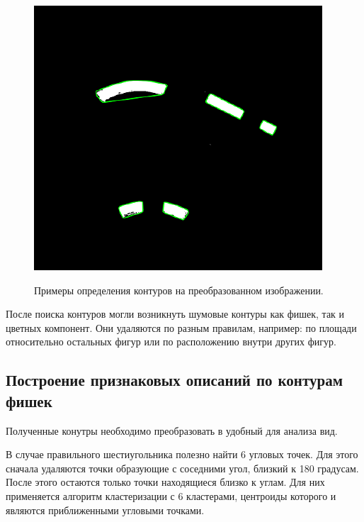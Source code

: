 \documentclass[10pt]{article}
\begin{document}
\begin{figure}[h]
\begin{minipage}[h]{0.19\linewidth}
\begin{center}
	    	\end{center}
	    \end{minipage}
        \hfill
        \begin{minipage}[h]{0.19\linewidth}
        	\begin{center}
        		{\includegraphics[width=1.0\linewidth]{data/red_example.pdf}}
        	\end{center}
        \end{minipage}
	    
		\caption{Примеры определения контуров на преобразованном изображении.}
		\label{ris:image3}
	\end{figure}
	
	После поиска контуров могли возникнуть шумовые контуры как фишек, так и цветных компонент. Они удаляются по разным правилам, например: по площади относительно остальных фигур или по расположению внутри других фигур.
	
	
	\subsection*{Построение признаковых описаний по контурам фишек}
	
	Полученные конутры необходимо преобразовать в удобный для анализа вид.
	
	В случае правильного шестиугольника полезно найти 6 угловых точек. Для этого сначала удаляются точки образующие с соседними угол, близкий к 180 градусам. После этого остаются только точки находящиеся близко к углам. Для них применяется алгоритм кластеризации с 6 кластерами, центроиды которого и являются приближенными угловыми точками.
	
\end{document}
